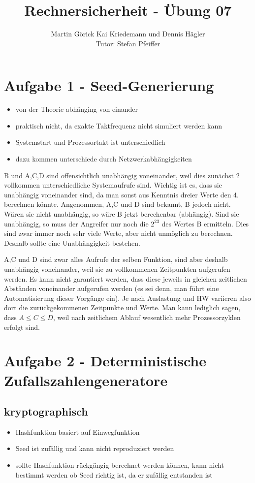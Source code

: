 \documentclass{scrartcl}
\title{Rechnersicherheit - Übung 07}
\author{Martin Görick Kai Kriedemann und Dennis Hägler \\ Tutor: Stefan Pfeiffer}
\begin{document}
\maketitle


\section*{Aufgabe 1 - Seed-Generierung}
\begin{itemize}
  \item von der Theorie abhänging von einander
  \item praktisch nicht, da exakte Taktfrequenz nicht simuliert werden kann
  \item Systemstart und Prozessortakt ist unterschiedlich
  \item dazu kommen unterschiede durch Netzwerkabhängigkeiten
\end{itemize}

B und A,C,D sind offensichtlich unabhängig voneinander, weil dies zunächst 2 vollkommen unterschiedliche 
Systemaufrufe sind. Wichtig ist es, dass sie unabhängig voneinander sind, da man sonst aus Kenntnis dreier 
Werte den 4. berechnen könnte. Angenommen, A,C und D sind bekannt, B jedoch nicht. Wären sie nicht unabhängig, 
so wäre B jetzt berechenbar (abhängig). Sind sie unabhängig, so muss der Angreifer nur noch die $2^{23}$ des 
Wertes B ermitteln. Dies sind zwar immer noch sehr viele Werte, aber nicht unmöglich zu berechnen. Deshalb 
sollte eine Unabhängigkeit bestehen.
\newline

A,C und D sind zwar alles Aufrufe der selben Funktion, sind aber deshalb unabhängig voneinander, weil sie zu 
vollkommenen Zeitpunkten aufgerufen werden. Es kann nicht garantiert werden, dass diese jeweils in gleichen 
zeitlichen Abständen voneinander aufgerufen werden (es sei denn, man führt eine Automatisierung dieser 
Vorgänge ein). Je nach Auslastung und HW variieren also dort die zurückgekommenen Zeitpunkte und Werte. 
Man kann lediglich sagen, dass $A \leq C \leq D$, weil nach zeitlichem Ablauf wesentlich mehr 
Prozessorzyklen erfolgt sind.

\section*{Aufgabe 2 - Deterministische Zufallszahlengeneratore}
\subsection*{kryptographisch}
\begin{itemize}
  \item Hashfunktion basiert auf Einwegfunktion
  \item Seed ist zufällig und kann nicht reproduziert werden
  \item sollte Hashfunktion rückgängig berechnet werden können, kann nicht
    bestimmt werden ob Seed richtig ist, da er zufällig entstanden ist
\end{itemize}
\end{document}
